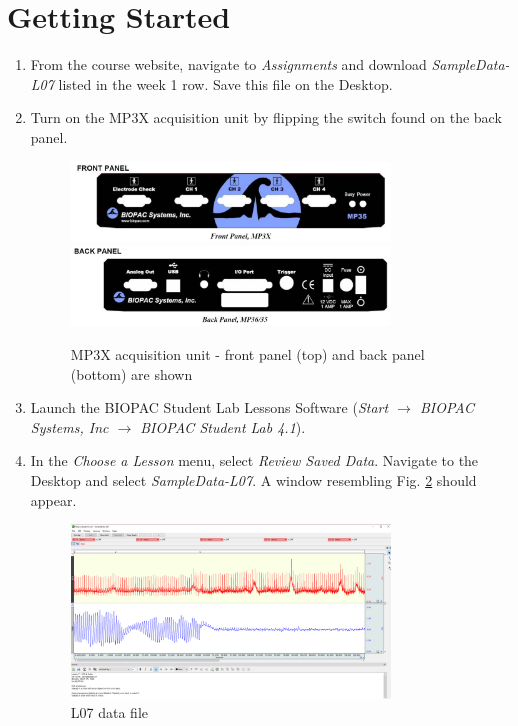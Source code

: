 \documentclass{article}
\begin{document}
\section*{Getting Started}
\begin{enumerate}
	\item From the course website, navigate to \textit{Assignments} and download \textit{SampleData-L07} listed in the week 1 row. Save this file on the Desktop.
	\item Turn on the MP3X acquisition unit by flipping the switch found on the back panel.
		\begin{figure}[h]
		\includegraphics[width=0.8\textwidth]{../images/BIOPAC_2a.jpg}
		\includegraphics[width=0.8\textwidth]{../images/BIOPAC_2b.jpg}
		\centering
		\caption{MP3X acquisition unit - front panel (top) and back panel (bottom) are shown}
		\label{panels}
		\end{figure}
		
	\item Launch the BIOPAC Student Lab Lessons Software (\textit{Start $\rightarrow$ BIOPAC Systems, Inc $\rightarrow$ BIOPAC Student Lab 4.1}).
	\item In the \textit{Choose a Lesson} menu, select \textit{Review Saved Data}. Navigate to the Desktop and select \textit{SampleData-L07}. A window resembling Fig. \ref{sample_data} should appear.
	
		\begin{figure}[h]
		\includegraphics[width=0.8\textwidth]{../images/BIOPAC_21.png}
		\centering
		\caption{L07 data file}
		\label{sample_data}
		\end{figure}
\end{enumerate}
\end{document}

